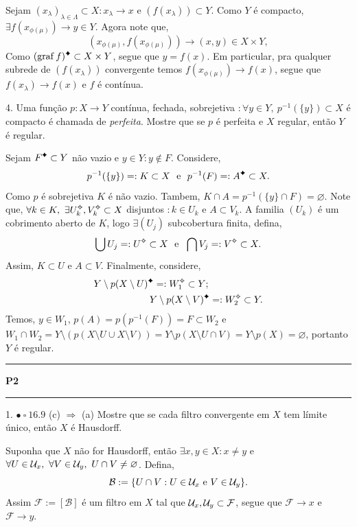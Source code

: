 \textcolor{gris}{Sejam \((x_\lambda)_{\lambda \in\Lambda} \subset X: x_\lambda \to x \) e \((f(x_\lambda)) \subset Y\). Como \(Y\) é compacto, \(\exists f(x_{\phi(\mu)}) \to y \in Y\). Agora note que, 
\[(x_{\phi(\mu)}, f(x_{\phi(\mu)})) \to (x,y) \in X \times Y, \]
Como \( (\operatorname{graf}f)\ce \subset X \times Y\), segue que \(y= f(x)\). Em particular, pra qualquer subrede de \((f(x_\lambda ))\) convergente temos \(f(x_{\phi(\mu)}) \to f(x)\), segue que \(f(x_\lambda) \to f(x)\) e \(f\) é contínua. 
} 

4. Uma função \(p : X \to Y \) contínua, fechada, sobrejetiva \(: \forall y \in Y, \ p^{-1}(\{y\})\subset X \) é compacto é chamada de \emph{perfeita}. Mostre que se \(p\) é perfeita e \(X\) regular, então \(Y \) é regular.     

\textcolor{gris}{Sejam \(F\ce \subset Y\) não vazio e \(y\in Y : y \notin F \). Considere, 
\[p^{-1}(\{y\})=:K \subset X \text{ \ e \ } p^{-1}(F)=: A\ce \subset X. \]  
Como \(p\) é sobrejetiva \(K\) é não vazio. Tambem, \(K \cap A = p^{-1}(\{y\} \cap F) = \varnothing\). Note que, \(\forall k \in K, \ \exists U_k\ab, V_k\ab \subset X \) disjuntos \(: k \in U_k\) e \(A \subset V_k\). A familia \((U_k)\) é um cobrimento aberto de \(K\), logo \(\exists (U_j)\) subcobertura finita, defina, 
\[\bigcup U_j =: U\ab \subset X \text{ \ e \ } \bigcap V_j=: V\ab \subset X. \]
Assim, \(K\subset U\) e \(A \subset V\). Finalmente, considere, 
\begin{align*}
Y\setminus p(X\setminus U)\ce =: W_1\ab \subset Y; \hspace{2cm}\\
Y\setminus p(X\setminus V)\ce =: W_2\ab \subset Y.
\end{align*}
Temos, \(y \in W_1\), \(p(A) = p(p^{-1}(F)) = F \subset W_2\) e \(W_1 \cap W_2 = Y\setminus (p(X\setminus U \cup X\setminus V)) = Y \setminus p(X\setminus U \cap V ) = Y \setminus p(X) = \varnothing \), portanto \(Y\) é regular.  
}
\-\vspace{0.1cm}
  {\hrule \vspace{-0.15cm}
  \centering \textbf{P2} \vspace{0.1cm}
  \hrule}

1. \(\bullet \ \square \ 16.9\) (c) \(\Rightarrow\) (a) Mostre que se cada filtro convergente em \(X\) tem límite único, então \(X\) é Hausdorff.  

\textcolor{gris}{Suponha que \(X \) não for Hausdorff, então \(\exists x, y \in X : x\neq y\) e \(\forall U \in \U_x, \ \forall V\in \U_y, \ U\cap V \neq \varnothing\). Defina, 
\[\mathcal{B} : = \{U \cap V : U \in \mathcal{U}_x \text{ e } V \in \mathcal{U}_y\}. \]
Assim \(\mathcal{F} := [\mathcal{B}]\) é um filtro em \(X\) tal que \( \mathcal{U}_x, \mathcal{U}_y \subset \mathcal{F}\), segue que \(\mathcal{F} \to x\) e \(\mathcal{F} \to y\). 
}  

